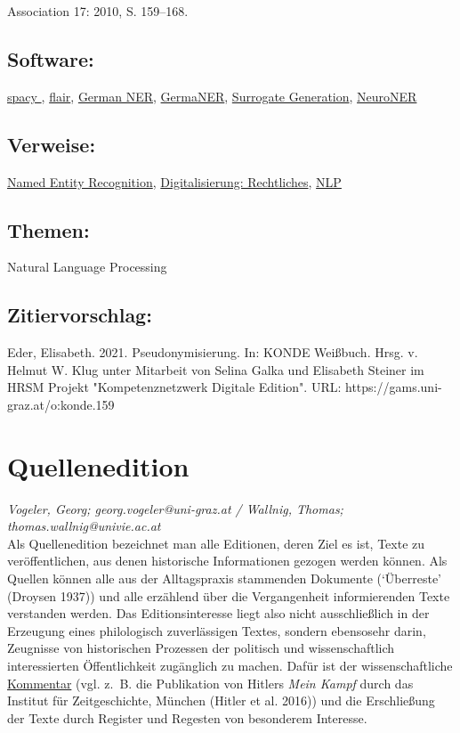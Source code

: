 \documentclass{article}
\begin{document}
\begin{itemize}
                              Association 17: 2010, S. 159–168.\end{itemize}\subsection*{Software:}\href{https://spacy.io/}{spacy }, \href{https://github.com/zalandoresearch/flair}{flair}, \href{https://www.ims.uni-stuttgart.de/forschung/ressourcen/werkzeuge/german-ner/}{German NER}, \href{https://github.com/tudarmstadt-lt/GermaNER}{GermaNER}, \href{https://github.com/ee-2/SurrogateGeneration}{Surrogate Generation}, \href{http://neuroner.com/}{NeuroNER}\subsection*{Verweise:}\href{https://gams.uni-graz.at/o:konde.141}{Named Entity Recognition}, \href{https://gams.uni-graz.at/o:konde.223}{Digitalisierung:
                           Rechtliches}, \href{https://gams.uni-graz.at/o:konde.145}{NLP}\subsection*{Themen:}Natural Language Processing\subsection*{Zitiervorschlag:}Eder, Elisabeth. 2021. Pseudonymisierung. In: KONDE Weißbuch. Hrsg. v. Helmut W. Klug unter Mitarbeit von Selina Galka und Elisabeth Steiner im HRSM Projekt "Kompetenznetzwerk Digitale Edition". URL: https://gams.uni-graz.at/o:konde.159\newpage\section*{Quellenedition} \emph{Vogeler, Georg; georg.vogeler@uni-graz.at / Wallnig, Thomas;
                  thomas.wallnig@univie.ac.at }\\
        
    Als Quellenedition bezeichnet man alle Editionen, deren Ziel es ist, Texte zu
                  veröffentlichen, aus denen historische Informationen gezogen werden können. Als
                  Quellen können alle aus der Alltagspraxis stammenden Dokumente (‘Überreste’
                     (Droysen 1937)) und alle erzählend über die Vergangenheit
                  informierenden Texte verstanden werden. Das Editionsinteresse liegt also nicht
                  ausschließlich in der Erzeugung eines philologisch zuverlässigen Textes, sondern
                  ebensosehr darin, Zeugnisse von historischen Prozessen der politisch und
                  wissenschaftlich interessierten Öffentlichkeit zugänglich zu machen. Dafür ist der
                  wissenschaftliche \href{http://gams.uni-graz.at/o:konde.34}{Kommentar} (vgl.
                  z. B. die Publikation von Hitlers \emph{Mein Kampf} durch das
                  Institut für Zeitgeschichte, München (Hitler et al. 2016)) und die
                  Erschließung der Texte durch Register und Regesten von besonderem Interesse. \\
            
\end{document}
